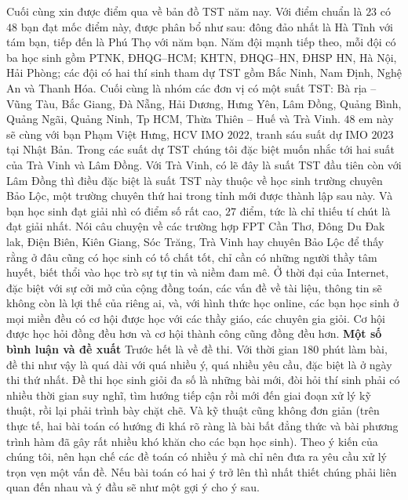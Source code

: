 \begin{multicols}{2}
	\vskip 0.1cm
	Cuối cùng xin được điểm qua về bản đồ TST năm nay. Với điểm chuẩn là $23$ có $48$ bạn đạt mốc điểm này, được phân bổ như sau: đông đảo nhất là Hà Tĩnh với tám bạn, tiếp đến là Phú Thọ với năm bạn. Năm đội mạnh tiếp theo, mỗi đội có ba học sinh gồm PTNK, ĐHQG--HCM; KHTN, ĐHQG--HN, ĐHSP HN, Hà Nội, Hải Phòng; các đội có hai thí sinh tham dự TST gồm Bắc Ninh, Nam Định, Nghệ An và Thanh Hóa. Cuối cùng là nhóm các đơn vị có một suất TST: Bà rịa -- Vũng Tàu, Bắc Giang, Đà Nẵng, Hải Dương, Hưng Yên, Lâm Đồng, Quảng Bình, Quảng Ngãi, Quảng Ninh, Tp HCM, Thừa Thiên -- Huế và Trà Vinh. $48$ em này sẽ cùng với bạn Phạm Việt Hưng, HCV IMO $2022$, tranh sáu suất dự IMO $2023$ tại Nhật Bản. 
	\vskip 0.1cm
	Trong các suất dự TST chúng tôi đặc biệt muốn nhắc tới hai suất của Trà Vinh và Lâm Đồng. Với Trà Vinh, có lẽ đây là suất TST đầu tiên còn với Lâm Đồng thì điều đặc biệt là suất TST này thuộc về học sinh trường chuyên Bảo Lộc, một trường chuyên thứ hai trong tỉnh mới được thành lập sau này. Và bạn học sinh đạt giải nhì có điểm số rất cao, $27$ điểm, tức là chỉ thiếu tí chút là đạt giải nhất.
	\vskip 0.1cm
	Nói câu chuyện về các trường hợp FPT Cần Thơ, Đông Du Đak lak, Điện Biên, Kiên Giang, Sóc Trăng, Trà Vinh hay chuyên Bảo Lộc để thấy rằng ở đâu cũng có học sinh có tố chất tốt, chỉ cần có những người thầy tâm huyết, biết thổi vào học trò sự tự tin và niềm đam mê. Ở thời đại của Internet, đặc biệt với sự cởi mở của cộng đồng toán, các vấn đề về tài liệu, thông tin sẽ không còn là lợi thế của riêng ai, và, với hình thức học online, các bạn học sinh ở mọi miền đều có cơ hội được học với các thầy giáo, các chuyên gia giỏi. Cơ hội được học hỏi đồng đều hơn và cơ hội thành công cũng đồng đều hơn.
	\vskip 0.1cm
	\textbf{Một số bình luận và đề xuất}
	\vskip 0.1cm
	Trước hết là về đề thi. Với thời gian $180$ phút làm bài, đề thi như vậy là quá dài với quá nhiều ý, quá nhiều yêu cầu, đặc biệt là ở ngày thi thứ nhất. Đề thi học sinh giỏi đa số là những bài mới, đòi hỏi thí sinh phải có nhiều thời gian suy nghĩ, tìm hướng tiếp cận rồi mới đến giai đoạn xử lý kỹ thuật, rồi lại phải trình bày chặt chẽ. Và kỹ thuật cũng không đơn giản (trên thực tế, hai bài toán có hướng đi khá rõ ràng là bài bất đẳng thức và bài phương trình hàm đã gây rất nhiều khó khăn cho các bạn học sinh). Theo ý kiến của chúng tôi, nên hạn chế các đề toán có nhiều ý mà chỉ nên đưa ra yêu cầu xử lý trọn vẹn một vấn đề. Nếu bài toán có hai ý trở lên thì nhất thiết chúng phải liên quan đến nhau và ý đầu sẽ như một gợi ý cho ý sau.
	\vskip 0.1cm

\end{multicols}
